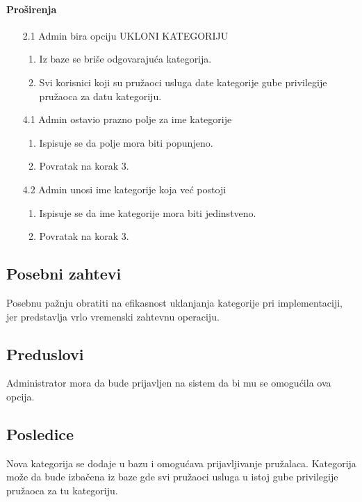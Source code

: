 \documentclass[a4paper,12pt]{report}
\begin{document}
			\paragraph*{Proširenja}
				\begin{enumerate}
					\item[2.1] Admin bira opciju UKLONI KATEGORIJU
						\begin{enumerate}[noitemsep,topsep=-8pt]
							\item Iz baze se briše odgovarajuća kategorija.
							\item Svi korisnici koji su pružaoci usluga date kategorije gube privilegije pružaoca za datu kategoriju.
						\end{enumerate}
					\item[4.1] Admin ostavio prazno polje za ime kategorije
					\begin{enumerate}[noitemsep,topsep=-8pt]
						\item Ispisuje se da polje mora biti popunjeno.
						\item Povratak na korak 3.
					\end{enumerate}
					\item[4.2] Admin unosi ime kategorije koja već postoji
					\begin{enumerate}[noitemsep,topsep=-8pt]
						\item Ispisuje se da ime kategorije mora biti jedinstveno.
						\item Povratak na korak 3.
					\end{enumerate}
				\end{enumerate}
		\subsection{Posebni zahtevi}
			Posebnu pažnju obratiti na efikasnost uklanjanja kategorije pri implementaciji, jer predstavlja vrlo vremenski zahtevnu operaciju.
		\subsection{Preduslovi}
			Administrator mora da bude prijavljen na sistem da bi mu se omogućila ova opcija.
		\subsection{Posledice}
			Nova kategorija se dodaje u bazu i omogućava prijavljivanje pružalaca.
			Kategorija može da bude izbačena iz baze gde svi pružaoci usluga u istoj gube privilegije pružaoca za tu kategoriju.
\end{document}
